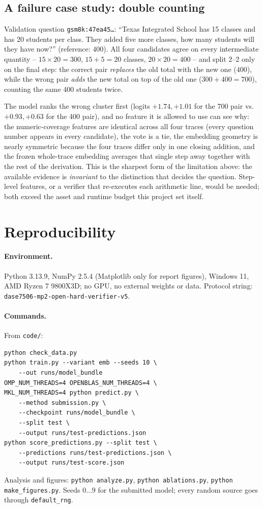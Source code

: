 \documentclass[10pt,a4paper]{article}
\begin{document}
\subsection{A failure case study: double counting}
\label{sec:case}
Validation question \texttt{gsm8k:47ea45\ldots}: ``Texas Integrated School has
15 classes and has 20 students per class. They added five more classes, how
many students will they have now?'' (reference: $400$). All four candidates
agree on every intermediate quantity -- $15\times20=300$, $15+5=20$ classes,
$20\times20=400$ -- and split 2--2 only on the final step: the correct pair
\emph{replaces} the old total with the new one ($400$), while the wrong pair
\emph{adds} the new total on top of the old one ($300+400=700$), counting the
same 400 students twice.

The model ranks the wrong cluster first (logits $+1.74,+1.01$ for the 700 pair
vs.\ $+0.93,+0.63$ for the 400 pair), and no feature it is allowed to use can
see why: the numeric-coverage features are identical across all four traces
(every question number appears in every candidate), the vote is a tie, the
embedding geometry is nearly symmetric because the four traces differ only in
one closing addition, and the frozen whole-trace embedding averages that single
step away together with the rest of the derivation. This is the sharpest form
of the limitation above: the available evidence is \emph{invariant} to the
distinction that decides the question. Step-level features, or a verifier that
re-executes each arithmetic line, would be needed; both exceed the asset and
runtime budget this project set itself.

\section{Reproducibility}
\label{sec:repro}

\paragraph{Environment.} Python 3.13.9, NumPy 2.5.4 (Matplotlib only for
report figures), Windows 11, AMD Ryzen 7 9800X3D; no GPU, no external weights
or data. Protocol string: \texttt{dase7506-mp2-open-hard-verifier-v5}.

\paragraph{Commands.} From \texttt{code/}:
\begin{verbatim}
python check_data.py
python train.py --variant emb --seeds 10 \
    --out runs/model_bundle
OMP_NUM_THREADS=4 OPENBLAS_NUM_THREADS=4 \
MKL_NUM_THREADS=4 python predict.py \
    --method submission.py \
    --checkpoint runs/model_bundle \
    --split test \
    --output runs/test-predictions.json
python score_predictions.py --split test \
    --predictions runs/test-predictions.json \
    --output runs/test-score.json
\end{verbatim}
Analysis and figures: \texttt{python analyze.py}, \texttt{python ablations.py},
\texttt{python make\_figures.py}. Seeds $0\dots9$ for the submitted model;
every random source goes through \texttt{default\_rng}.
\end{document}
